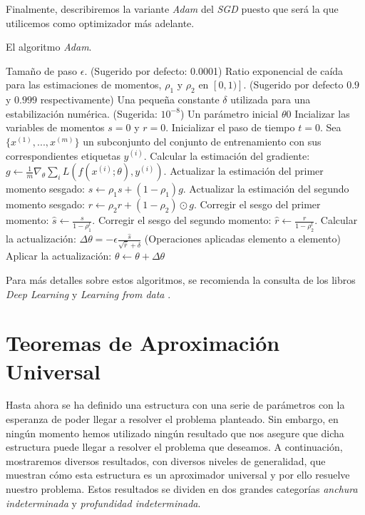 \begin{itemize}
Finalmente, describiremos la variante \emph{Adam} del \emph{SGD} puesto que será la que utilicemos como optimizador más adelante.\\

\begin{algorithm}
\caption{El algoritmo \emph{Adam}. \cite{Goodfellow-et-al-2016}}
\begin{algorithmic}
\REQUIRE Tamaño de paso $\epsilon$. (Sugerido por defecto: 0.0001)
\REQUIRE Ratio exponencial de caída para las estimaciones de momentos, $\rho_1$ y $\rho_2$ en $[0,1)]$. (Sugerido por defecto $0.9$ y $0.999$ respectivamente)
\REQUIRE Una pequeña constante $\delta$ utilizada para una estabilización numérica. (Sugerida: $10^{-8}$)
\REQUIRE Un parámetro inicial $\theta$0
\STATE Incializar las variables de momentos $s=0$ y $r=0$.
\STATE Inicializar el paso de tiempo $t=0$.
\STATE Sea $\{x^{(1)},...,x^{(m)}\}$  un subconjunto del conjunto de entrenamiento con sus correspondientes etiquetas $y^{(i)}$.
\STATE Calcular la estimación del gradiente: $g\leftarrow \frac{1}{m}\nabla_\theta \sum_i L(f(x^{(i)};\theta),y^{(i)})$.
\STATE Actualizar la estimación del primer momento sesgado: $s\leftarrow \rho_1 s+(1-\rho_1)g$.
\STATE Actualizar la estimación del segundo momento sesgado: $r\leftarrow \rho_2 r +(1-\rho_2) \odot g$.
\STATE Corregir el sesgo del primer momento: $\hat{s} \leftarrow \frac{s}{1-\rho_1^t}$.
\STATE Corregir el sesgo del segundo momento: $\hat{r} \leftarrow \frac{r}{1-\rho_2^t}$.
\STATE Calcular la actualización: $\Delta\theta = -\epsilon \frac{\hat{s}}{\sqrt{\hat{r}}+\delta}$ (Operaciones aplicadas elemento a elemento)
\STATE Aplicar la actualización: $\theta \leftarrow \theta + \Delta \theta$
\ENDWHILE
\end{algorithmic}
\end{algorithm}
Para más detalles sobre estos algoritmos, se recomienda la consulta de los libros \emph{Deep Learning} \cite{Goodfellow-et-al-2016} y \emph{Learning from data} \cite{10.5555/2207825}. \\
\chapter{Teoremas de Aproximación Universal}
Hasta ahora se ha definido una estructura con una serie de parámetros con la esperanza de poder llegar a resolver el problema planteado. Sin embargo, en ningún momento hemos utilizado ningún resultado que nos asegure que dicha estructura puede llegar a resolver el problema que deseamos. A continuación, mostraremos diversos resultados, con diversos niveles de generalidad, que muestran cómo esta estructura es un aproximador universal y por ello resuelve nuestro problema. Estos resultados se dividen en dos grandes categorías \emph{anchura indeterminada} y \emph{profundidad indeterminada}.


\end{itemize}
